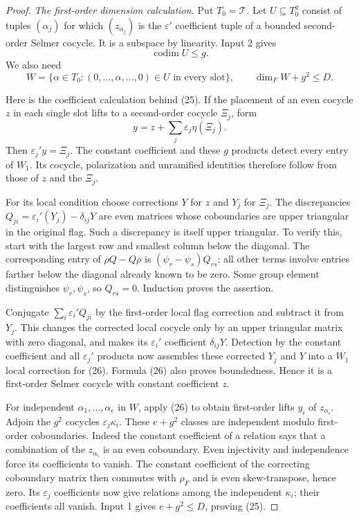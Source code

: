 \begin{proof}
\emph{The first-order dimension calculation.}
Put $T_0=\mathcal T$.  Let $U\subseteq T_0^g$ consist of tuples
$(\alpha_j)$ for which $(z_{\alpha_j})$ is the
$\varepsilon'$ coefficient tuple of a bounded second-order
Selmer cocycle.  It is a subspace by linearity.
Input 2 gives
\[
                          \operatorname{codim}U\leq g.         \tag{24}
\]
We also need
\[
 W=\{\alpha\in T_0:
 (0,\ldots,\alpha,\ldots,0)\in U\text{ in every slot}\},
 \qquad                      \dim_F W+g^2\leq D.               \tag{25}
\]

Here is the coefficient calculation behind (25).
If the placement of an even cocycle $z$ in each single slot
lifts to a second-order cocycle $\Xi_j$, form
\[
                         y=z+\sum_j\varepsilon_j\eta(\Xi_j).
                                                               \tag{26}
\]
Then $\varepsilon_j'y=\Xi_j$.
The constant coefficient and these $g$ products detect every
entry of $W_1$.  Its cocycle, polarization and unramified
identities therefore follow from those of $z$ and the $\Xi_j$.

For its local condition choose corrections $Y$ for $z$ and
$Y_j$ for $\Xi_j$.  The discrepancies
$Q_{ji}=\varepsilon_i'(Y_j)-\delta_{ij}Y$ are even matrices
whose coboundaries are upper triangular in the original flag.
Such a discrepancy is itself upper triangular.
To verify this, start with the largest row and smallest column
below the diagonal.  The corresponding entry of
$\rho Q-Q\rho$ is $(\psi_r-\psi_s)Q_{rs}$; all other terms
involve entries farther below the diagonal already known to
be zero.  Some group element distinguishes $\psi_r,\psi_s$,
so $Q_{rs}=0$.  Induction proves the assertion.

Conjugate $\sum_i\varepsilon_i'Q_{ji}$ by the first-order
local flag correction and subtract it from $Y_j$.
This changes the corrected local cocycle only by an upper
triangular matrix with zero diagonal, and makes its
$\varepsilon_i'$ coefficient $\delta_{ij}Y$.
Detection by the constant coefficient and all
$\varepsilon_j'$ products now assembles these corrected $Y_j$
and $Y$ into a $W_1$ local correction for (26).
Formula (26) also proves boundedness.  Hence it is a
first-order Selmer cocycle with constant coefficient $z$.

For independent $\alpha_1,\ldots,\alpha_e$ in $W$, apply (26)
to obtain first-order lifts $y_i$ of $z_{\alpha_i}$.
Adjoin the $g^2$ cocycles $\varepsilon_j\kappa_i$.
These $e+g^2$ classes are independent modulo first-order
coboundaries.
Indeed the constant coefficient of a relation says that
a combination of the $z_{\alpha_i}$ is an even coboundary.
Even injectivity and independence force its coefficients to
vanish.  The constant coefficient of the correcting
coboundary matrix then commutes with $\rho_F$ and is even
skew-transpose, hence zero.  Its $\varepsilon_j$ coefficients
now give relations among the independent $\kappa_i$; their
coefficients all vanish.
Input 1 gives $e+g^2\leq D$, proving (25).


\end{proof}
